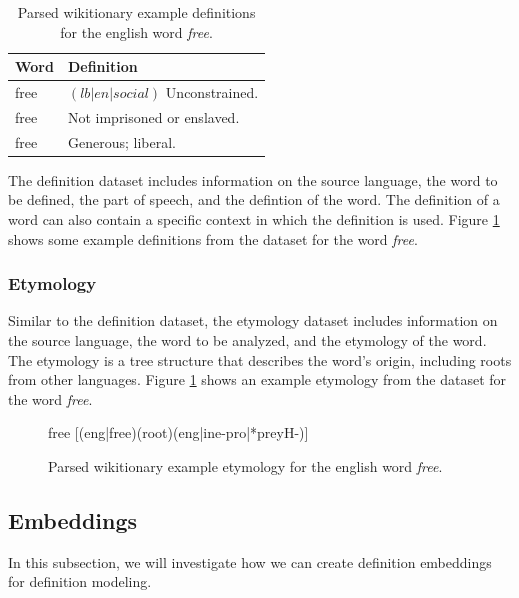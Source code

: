 \documentclass[11pt,a4paper]{article}
\begin{document}
\begin{table}[h]
  \centering
  \begin{tabular}{|l|l|}
    \hline
    \textbf{Word} & \textbf{Definition}             \\
    \hline\hline
    free          & $(lb|en|social)$ Unconstrained. \\
    free          & Not imprisoned or enslaved.     \\
    free          & Generous; liberal.              \\
    \hline
  \end{tabular}
  \caption{Parsed wikitionary example definitions for the english word
    \textit{free}.}
  \label{tab:wiktionary_definitions}
\end{table}

The definition dataset includes information on the source language, the word to
be defined, the part of speech, and the defintion of the word. The definition of
a word can also contain a specific context in which the definition is used.
Figure \ref{tab:wiktionary_definitions} shows some example definitions from the
dataset for the word \textit{free}.

\subsubsection{Etymology}

Similar to the definition dataset, the etymology dataset includes information on
the source language, the word to be analyzed, and the etymology of the word. The
etymology is a tree structure that describes the word's origin, including roots
from other languages. Figure \ref{fig:wiktionary_etymology} shows an example
etymology from the dataset for the word \textit{free}.

\begin{figure}[h]
  \color{blue}free \color{black}[\color{green}(eng|free)\color{blue}(root)\color{red}(eng|ine-pro|*preyH-)\color{black}]
  \caption{Parsed wikitionary example etymology for the english word
    \textit{free}.}
  \label{fig:wiktionary_etymology}
\end{figure}

\subsection{Embeddings}

In this subsection, we will investigate how we can create definition embeddings
for definition modeling.
\end{document}
